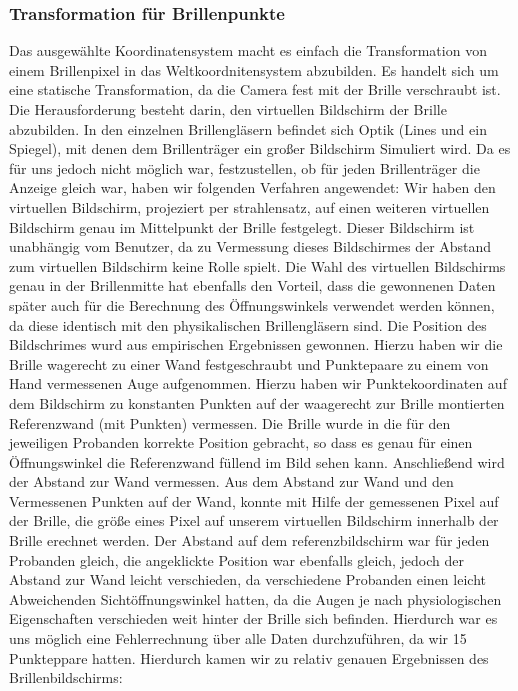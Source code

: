 \subsubsection{Transformation für Brillenpunkte}
Das ausgewählte Koordinatensystem macht es einfach die Transformation von einem Brillenpixel in das Weltkoordnitensystem abzubilden. Es handelt sich um eine statische Transformation, da die Camera fest mit der Brille verschraubt ist. Die Herausforderung besteht darin, den virtuellen Bildschirm der Brille abzubilden. In den einzelnen Brillengläsern befindet sich Optik (Lines und ein Spiegel), mit denen dem Brillenträger ein großer Bildschirm Simuliert wird. Da es für uns jedoch nicht möglich war, festzustellen, ob für jeden Brillenträger die Anzeige gleich war, haben wir folgenden Verfahren angewendet: Wir haben den virtuellen Bildschirm, projeziert per strahlensatz, auf einen weiteren virtuellen Bildschirm genau im Mittelpunkt der Brille festgelegt. Dieser Bildschirm ist unabhängig vom Benutzer, da zu Vermessung dieses Bildschirmes der Abstand zum virtuellen Bildschirm keine Rolle spielt.
Die Wahl des virtuellen Bildschirms genau in der Brillenmitte hat ebenfalls den Vorteil, dass die gewonnenen Daten später auch für die Berechnung des Öffnungswinkels verwendet werden können, da diese identisch mit den physikalischen Brillengläsern sind.
Die Position des Bildschrimes wurd aus empirischen Ergebnissen gewonnen. Hierzu haben wir die Brille wagerecht zu einer Wand festgeschraubt und Punktepaare zu einem von Hand vermessenen Auge aufgenommen. Hierzu haben wir Punktekoordinaten auf dem Bildschirm zu konstanten Punkten auf der waagerecht zur Brille montierten Referenzwand (mit Punkten) vermessen. Die Brille wurde in die für den jeweiligen Probanden korrekte Position gebracht, so dass es genau für einen Öffnungswinkel die Referenzwand füllend im Bild sehen kann. Anschließend wird der Abstand zur Wand vermessen. Aus dem Abstand zur Wand und den Vermessenen Punkten auf der Wand, konnte mit Hilfe der gemessenen Pixel auf der Brille, die größe eines Pixel auf unserem virtuellen Bildschirm innerhalb der Brille erechnet werden. Der Abstand auf dem referenzbildschirm war für jeden Probanden gleich, die angeklickte Position war ebenfalls gleich, jedoch der Abstand zur Wand leicht verschieden, da verschiedene Probanden einen leicht Abweichenden Sichtöffnungswinkel hatten, da die Augen je nach physiologischen Eigenschaften verschieden weit hinter der Brille sich befinden. Hierdurch war es uns möglich eine Fehlerrechnung über alle Daten durchzuführen, da wir 15 Punkteppare hatten. Hierdurch kamen wir zu relativ genauen Ergebnissen des Brillenbildschirms:
    
